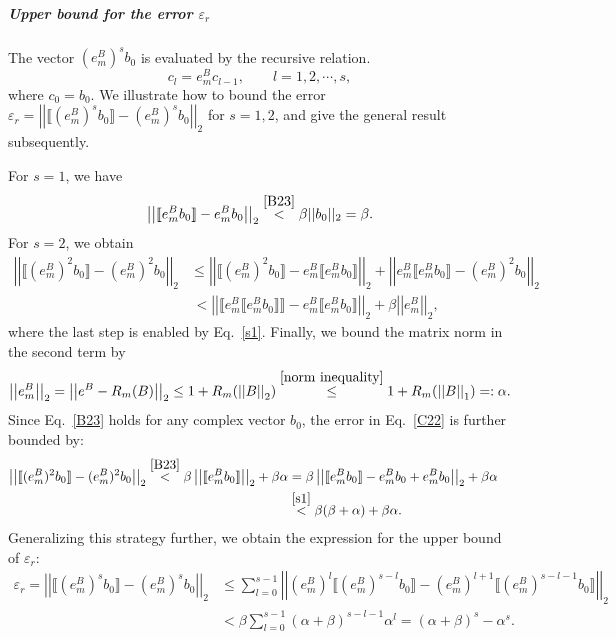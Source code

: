 \documentclass[12pt]{article}
\renewcommand{\norm}[1]{\left|\left|#1\right|\right|}
\begin{document}
\subparagraph{Upper bound for the error $\varepsilon_r$}
\label{Upper bound of }
The vector $(e^B_m)^sb_0 $ is evaluated by the recursive relation.
\begin{equation}
\label{recursive relation2}
    c_l=e^B_m c_{l-1},\qquad l=1,2,\cdots,s,
\end{equation}
where $c_0=b_0$. 
We illustrate how to bound the error $\varepsilon_r=\norm{\llbracket (e^B_m)^sb_0\rrbracket-(e^B_m)^sb_0 }_2$ for $s=1,2$, and give the general result subsequently. 

For $s=1$, we have 
\begin{equation}
\label{s1}
    \norm{\llbracket e^B_mb_0\rrbracket-e^B_mb_0 }_2\overset{\eqref{B23}}{<}\beta||b_0||_2=\beta.
\end{equation}
For $s=2$, we obtain
\begin{align}
\label{C22}
\nonumber    \norm{\llbracket (e^B_m)^2b_0\rrbracket-(e^B_m)^2b_0 }_2 &\leq\norm{\llbracket (e^B_m)^2b_0\rrbracket-     
    e^B_m\llbracket e^B_mb_0\rrbracket}_2+\norm{e^B_m\llbracket e^B_mb_0\rrbracket-(e^B_m)^2b_0}_2\\
   &\, <\norm{\llbracket e^B_m \llbracket e^B_mb_0\rrbracket\rrbracket-     
    e^B_m\llbracket e^B_mb_0\rrbracket}_2+\beta\norm{e^B_m}_2,
\end{align} 
where the last step is enabled by Eq.\ \eqref{s1}.
Finally, we bound the matrix norm in the second term by
\begin{equation}
    \norm{e^B_m}_2=\norm{e^B-R_m(B)}_2\leq 1+R_m(\norm{B}_2)\overset{\eqref{norm inequality}}{\leq} 1+R_m(\norm{B}_1)=:\alpha.
\end{equation}
Since Eq.\ \eqref{B23} holds for any complex vector $b_0$, the error in Eq.\ \eqref{C22} is further bounded by:
\begin{align}
    \norm{\llbracket (e^B_m)^2b_0\rrbracket-(e^B_m)^2b_0 }_2\overset{\eqref{B23}}{<}\beta\norm{\llbracket e^B_mb_0\rrbracket}_2+\beta\alpha &=\beta\norm{\llbracket e^B_mb_0\rrbracket-e^B_mb_0+e^B_mb_0}_2+\beta\alpha\quad\\
    &\overset{\eqref{s1}}{<}\beta(\beta+\alpha)+\beta\alpha.
\end{align}
Generalizing this strategy further, we obtain the expression for the upper bound of $\varepsilon_r$: 
\begin{align}
\label{rouding}
\nonumber    \varepsilon_r=\norm{\llbracket (e^B_m)^sb_0\rrbracket-(e^B_m)^sb_0 }_2 &\leq \sum_{l=0}^{s-1}\norm{(e^B_m)^l \llbracket (e^B_m)^{s-l}b_0\rrbracket-(e^B_m)^{l+1}\llbracket (e^B_m)^{s-l-1}b_0\rrbracket}_2\\
    &<\beta\sum_{l=0}^{s-1}(\alpha+\beta)^{s-l-1}\alpha^{l}=(\alpha+\beta)^s-\alpha^s.
\end{align}    
\end{document}
